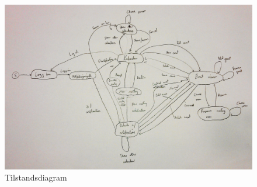 \begin{figure}[H]
\centering
\includegraphics[scale=0.165]{images/tilstandsdiagram.jpg}
\caption{Tilstandsdiagram}
\label{tilstandsdiagram_image}
\end{figure}